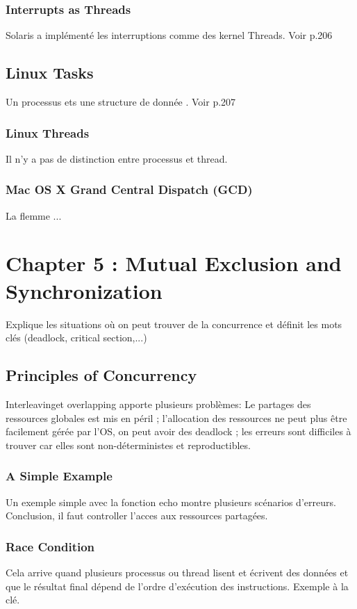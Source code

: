 \subsubsection{Interrupts as Threads}
Solaris a implémenté les interruptions comme des kernel Threads. Voir p.206
\subsection{Linux Tasks}
Un processus ets une structure de donnée . Voir p.207
\subsubsection{Linux Threads}
Il n’y a pas de distinction entre processus et thread.
\subsubsection{Mac OS X Grand Central Dispatch (GCD)}
La flemme ...

\newpage



\section{Chapter 5 : Mutual Exclusion and Synchronization}

Explique les situations où on peut trouver de la concurrence et définit les mots clés (deadlock, critical section,...)
\subsection{Principles of Concurrency}
Interleavinget overlapping apporte plusieurs problèmes: Le partages des ressources globales est mis en péril ; l’allocation des ressources ne peut plus être facilement gérée par l’OS, on peut avoir des deadlock ; les erreurs sont difficiles à trouver car elles sont non-déterministes et reproductibles.
\subsubsection{A Simple Example}
Un exemple simple avec la fonction echo montre plusieurs scénarios d’erreurs. Conclusion, il faut controller l’acces aux ressources partagées.
\subsubsection{Race Condition}
Cela arrive quand plusieurs processus ou thread lisent et écrivent des données et que le résultat final dépend de l’ordre d’exécution des instructions. Exemple à la clé.
